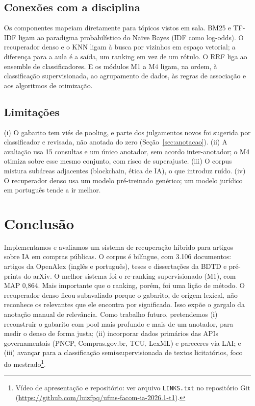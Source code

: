 \documentclass[12pt]{article}
\begin{document}
\subsection{Conexões com a disciplina}

Os componentes mapeiam diretamente para tópicos vistos em sala. BM25 e TF-IDF ligam ao paradigma probabilístico do Naïve Bayes (IDF como log-odds). O recuperador denso e o KNN ligam à busca por vizinhos em espaço vetorial; a diferença para a aula é a saída, um ranking em vez de um rótulo. O RRF liga ao ensemble de classificadores. E os módulos M1 a M4 ligam, na ordem, à classificação supervisionada, ao agrupamento de dados, às regras de associação e aos algoritmos de otimização.

\subsection{Limitações}

(i) O gabarito tem viés de pooling, e parte dos julgamentos novos foi sugerida por classificador e revisada, não anotada do zero (Seção~\ref{sec:anotacao}). (ii) A avaliação usa 15 consultas e um único anotador, sem acordo inter-anotador; o M4 otimiza sobre esse mesmo conjunto, com risco de superajuste. (iii) O corpus mistura subáreas adjacentes (blockchain, ética de IA), o que introduz ruído. (iv) O recuperador denso usa um modelo pré-treinado genérico; um modelo jurídico em português tende a ir melhor.

\section{Conclusão}

Implementamos e avaliamos um sistema de recuperação híbrido para artigos sobre IA em compras públicas. O corpus é bilíngue, com 3.106 documentos: artigos da OpenAlex (inglês e português), teses e dissertações da BDTD e pré-prints do arXiv. O melhor sistema foi o re-ranking supervisionado (M1), com MAP 0,864. Mais importante que o ranking, porém, foi uma lição de método. O recuperador denso ficou subavaliado porque o gabarito, de origem lexical, não reconhece os relevantes que ele encontra por significado. Isso expõe o gargalo da anotação manual de relevância. Como trabalho futuro, pretendemos (i) reconstruir o gabarito com pool mais profundo e mais de um anotador, para medir o denso de forma justa; (ii) incorporar dados primários das APIs governamentais (PNCP, Compras.gov.br, TCU, LexML) e pareceres via LAI; e (iii) avançar para a classificação semissupervisionada de textos licitatórios, foco do mestrado\footnote{Vídeo de apresentação e repositório: ver arquivo \texttt{LINKS.txt} no repositório Git (\url{https://github.com/luizfpq/ufms-facom-ia-2026.1-t1}).}.
\end{document}

